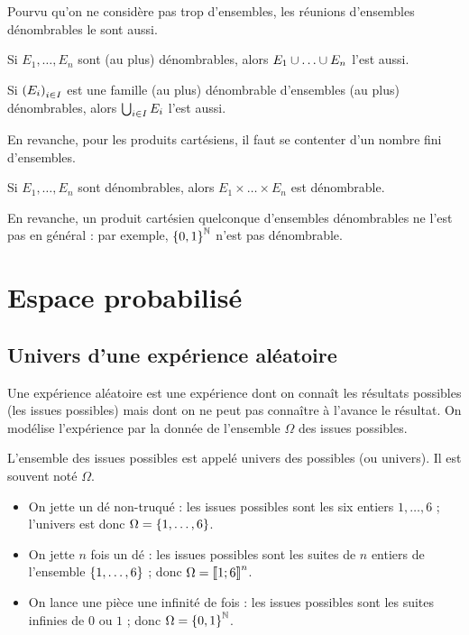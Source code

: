 Pourvu qu'on ne considère pas trop d'ensembles, les réunions d'ensembles dénombrables le sont aussi.

\begin{prop}
Si \(E_1,\dots,E_n\) sont (au plus) dénombrables, alors \(E_1\union\dots\union E_n\) l'est aussi.

Si \(\left(E_i\right)_{i\in I}\) est une famille (au plus) dénombrable d'ensembles (au plus) dénombrables, alors \(\bigcup_{i\in I}E_i\) l'est aussi.
\end{prop}

En revanche, pour les produits cartésiens, il faut se contenter d'un nombre fini d'ensembles.

\begin{prop}
Si \(E_1,\dots,E_n\) sont dénombrables, alors \(E_1\times\dots\times E_n\) est dénombrable.
\end{prop}

En revanche, un produit cartésien quelconque d'ensembles dénombrables ne l'est pas en général : par exemple, \(\left\lbrace0,1\right\rbrace^{\mathbb{N}}\) n'est pas dénombrable.

\section{Espace probabilisé}

\subsection{Univers d'une expérience aléatoire}

Une expérience aléatoire est une expérience dont on connaît les résultats possibles (les issues possibles) mais dont on ne peut pas connaître à l'avance le résultat. On modélise l'expérience par la donnée de l'ensemble \(\Omega\) des issues possibles.

\begin{defi}
L'ensemble des issues possibles est appelé univers des possibles (ou univers). Il est souvent noté \(\Omega\).
\end{defi}

\begin{ex}
\begin{itemize}
    \item On jette un dé non-truqué : les issues possibles sont les six entiers \(1,\dots,6\) ; l'univers est donc \(\Omega=\left\lbrace1,\dots,6\right\rbrace\). \\
    \item On jette \(n\) fois un dé : les issues possibles sont les suites de \(n\) entiers de l'ensemble \(\left\lbrace1,\dots,6\right\rbrace\) ; donc \(\Omega=\left\llbracket1;6\right\rrbracket^n\). \\
    \item On lance une pièce une infinité de fois : les issues possibles sont les suites infinies de \(0\) ou \(1\) ; donc \(\Omega=\left\lbrace0,1\right\rbrace^{\mathbb{N}}\).
\end{itemize}
\end{ex}


